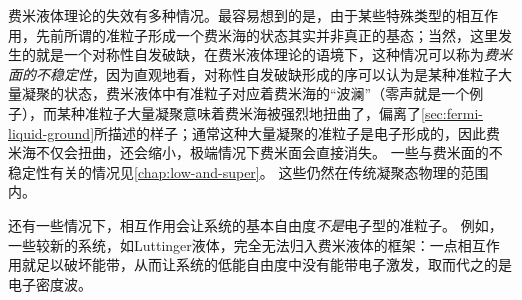 费米液体理论的失效有多种情况。最容易想到的是，由于某些特殊类型的相互作用，先前所谓的准粒子形成一个费米海的状态其实并非真正的基态；当然，这里发生的就是一个对称性自发破缺，在费米液体理论的语境下，这种情况可以称为\emph{费米面的不稳定性}，因为直观地看，对称性自发破缺形成的序可以认为是某种准粒子大量凝聚的状态，费米液体中有准粒子对应着费米海的“波澜”（零声就是一个例子），而某种准粒子大量凝聚意味着费米海被强烈地扭曲了，偏离了\autoref{sec:fermi-liquid-ground}所描述的样子；通常这种大量凝聚的准粒子是电子形成的，因此费米海不仅会扭曲，还会缩小，极端情况下费米面会直接消失。
一些与费米面的不稳定性有关的情况见\autoref{chap:low-and-super}。
这些仍然在传统凝聚态物理的范围内。

还有一些情况下，相互作用会让系统的基本自由度\emph{不是}电子型的准粒子。
例如，一些较新的系统，如Luttinger液体，完全无法归入费米液体的框架：一点相互作用就足以破坏能带，从而让系统的低能自由度中没有能带电子激发，取而代之的是电子密度波。
